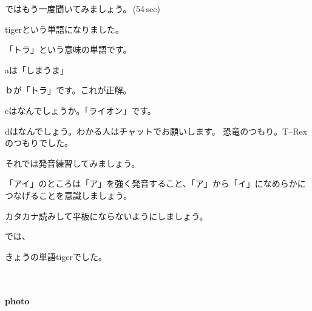 \documentclass[12pt]{jlreq}
\begin{document}
ではもう一度聞いてみましょう。\faVolumeUp\,(54\,sec)

tigerという単語になりました。

「トラ」という意味の単語です。

aは「しまうま」

ｂが「トラ」です。これが正解。

cはなんでしょうか。「ライオン」です。

dはなんでしょう。わかる人はチャットでお願いします。
恐竜のつもり。T--Rexのつもりでした。


それでは発音練習してみましょう。

「アイ」のところは「ア」を強く発音すること、「ア」から「イ」になめらかにつなげることを意識しましょう。

カタカナ読みして平板にならないようにしましょう。

では、

きょうの単語tigerでした。

{\large \ComputerMouse}\,\,


\paragraph{photo}
\end{document}
